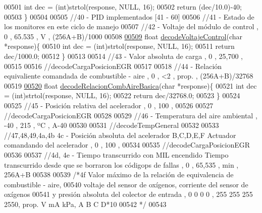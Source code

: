 \begin{DoxyCode}
{{{{{{{00501     \textcolor{keywordtype}{int} dec = (int)strtol(response, NULL, 16);
00502     \textcolor{keywordflow}{return} (dec/10.0)-40;
00503 \}
00504 
00505 \textcolor{comment}{//40 - PID implementados [41 - 60]}
00506 \textcolor{comment}{//41 - Estado de los monitores en este ciclo de manejo }
00507 \textcolor{comment}{//42 - Voltaje del módulo de control , 0 , 65.535 , V , (256A+B)/1000 }
00508 
\hyperlink{decoders_8hpp_a5937fc059394faad8c9c96a0b27a8796}{00509} \textcolor{keywordtype}{float} \hyperlink{decoders_8cpp_a5937fc059394faad8c9c96a0b27a8796}{decodeVoltajeControl}(\textcolor{keywordtype}{char} *response)\{
00510     \textcolor{keywordtype}{int} dec = (int)strtol(response, NULL, 16);
00511     \textcolor{keywordflow}{return} dec/1000.0;
00512 \}
00513 
00514 \textcolor{comment}{//43 - Valor absoluta de carga , 0 , 25,700 , %
00515 
00516 \textcolor{comment}{//decodeCargaPosicionEGR}
00517 
00518 \textcolor{comment}{//44 - Relación equivaliente comandada de combustible - aire , 0 , <2 , prop. , (256A+B)/32768 }
00519 
\hyperlink{decoders_8hpp_ade77bb9f8d8a2ba3aa431cdf9bdd0c32}{00520} \textcolor{keywordtype}{float} \hyperlink{decoders_8cpp_ade77bb9f8d8a2ba3aa431cdf9bdd0c32}{decodeRelacionCombAireBasica}(\textcolor{keywordtype}{char} *response)\{
00521     \textcolor{keywordtype}{int} dec = (int)strtol(response, NULL, 16);
00522     \textcolor{keywordflow}{return} dec/32768.0;
00523 \}
00524 
00525 \textcolor{comment}{//45 - Posición relativa del acelerador , 0 , 100 , %
00526 
00527 \textcolor{comment}{//decodeCargaPosicionEGR}
00528 
00529 \textcolor{comment}{//46 - Temperatura del aire ambiental , -40 , 215 , ºC , A-40 }
00530 
00531 \textcolor{comment}{//decodeTempGeneral}
00532 
00533 \textcolor{comment}{//47,48,49,4a,4b 4c - Posición absoluta del acelerador B,C,D,E,F  Actuador comandando del acelerador , 0 ,
       100 , %
00534 
00535 \textcolor{comment}{//decodeCargaPosicionEGR}
00536 
00537 \textcolor{comment}{//4d, 4e - Tiempo transcurrido con MIL encendido Tiempo transcurrido desde que se borraron los códigops de
       fallas , 0 , 65,535 , min , 256A+B }
00538 
00539 \textcolor{comment}{/*4f Valor máximo de la relación de equivalencia de combustible - aire,}
00540 \textcolor{comment}{ voltaje del sensor de oxígenos, corriente del sensor de oxígenos}
00541 \textcolor{comment}{  y presión absoluta del colector de entrada , 0 0 0 0 , 255 255 255 2550, prop. V mA kPa, A B C D*10   }
00542 \textcolor{comment}{*/}
00543 
}}}}}}}}}}
\end{DoxyCode}
